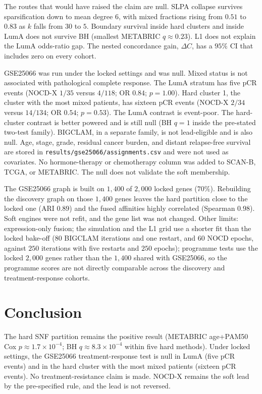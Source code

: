 \documentclass[11pt,a4paper]{article}
\begin{document}
The routes that would have raised the claim are null. SLPA collapse survives sparsification down to mean degree $6$, with mixed fractions rising from $0.51$ to $0.83$ as $k$ falls from $30$ to $5$. Boundary survival inside hard clusters and inside LumA does not survive BH (smallest METABRIC $q \approx 0.23$). L1 does not explain the LumA odds-ratio gap. The nested concordance gain, $\Delta C$, has a $95\%$ CI that includes zero on every cohort.

GSE25066 was run under the locked settings and was null. Mixed status is not associated with pathological complete response. The LumA stratum has five pCR events (NOCD-X $1/35$ versus $4/118$; OR $0.84$; $p=1.00$). Hard cluster 1, the cluster with the most mixed patients, has sixteen pCR events (NOCD-X $2/34$ versus $14/134$; OR $0.54$; $p=0.53$). The LumA contrast is event-poor. The hard-cluster contrast is better powered and is still null (BH $q=1$ inside the pre-stated two-test family). BIGCLAM, in a separate family, is not lead-eligible and is also null. Age, stage, grade, residual cancer burden, and distant relapse-free survival are stored in \texttt{results/gse25066/assignments.csv} and were not used as covariates. No hormone-therapy or chemotherapy column was added to SCAN-B, TCGA, or METABRIC. The null does not validate the soft membership.

The GSE25066 graph is built on $1{,}400$ of $2{,}000$ locked genes ($70\%$). Rebuilding the discovery graph on those $1{,}400$ genes leaves the hard partition close to the locked one (ARI $0.89$) and the fused affinities highly correlated (Spearman $0.98$). Soft engines were not refit, and the gene list was not changed. Other limits: expression-only fusion; the simulation and the L1 grid use a shorter fit than the locked bake-off ($80$ BIGCLAM iterations and one restart, and $60$ NOCD epochs, against $250$ iterations with five restarts and $250$ epochs); programme tests use the locked $2{,}000$ genes rather than the $1{,}400$ shared with GSE25066, so the programme scores are not directly comparable across the discovery and treatment-response cohorts.

\section{Conclusion}
The hard SNF partition remains the positive result (METABRIC age+PAM50 Cox $p \approx 1.7\times10^{-4}$; BH $q \approx 8.3\times10^{-4}$ within five hard methods). Under locked settings, the GSE25066 treatment-response test is null in LumA (five pCR events) and in the hard cluster with the most mixed patients (sixteen pCR events). No treatment-resistance claim is made. NOCD-X remains the soft lead by the pre-specified rule, and the lead is not reversed.
\end{document}
